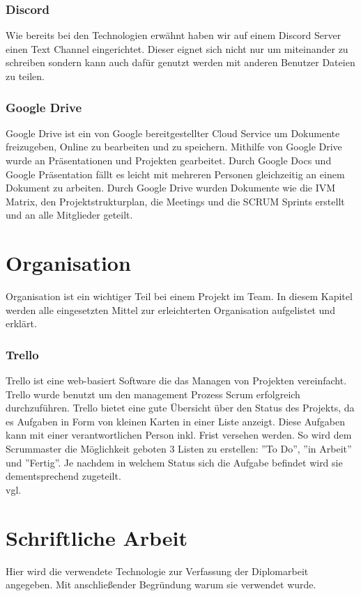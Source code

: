 \subsubsection {Discord}
\label{sec:Discord}
Wie bereits bei den Technologien erwähnt haben wir auf einem Discord Server einen Text Channel eingerichtet. Dieser eignet sich nicht nur um miteinander zu schreiben sondern kann auch dafür genutzt werden mit anderen Benutzer Dateien zu teilen. 
\subsubsection {Google Drive}
\label{sec:GoogleDrive}
Google Drive ist ein von Google bereitgestellter Cloud Service um Dokumente freizugeben, Online zu bearbeiten und zu speichern.
Mithilfe von Google Drive wurde an Präsentationen und Projekten gearbeitet. Durch Google Docs und Google Präsentation fällt es leicht mit mehreren Personen gleichzeitig an einem Dokument zu arbeiten. Durch Google Drive wurden Dokumente wie die IVM Matrix, den Projektstrukturplan, die Meetings und die SCRUM Sprints erstellt und an alle Mitglieder geteilt. 
\section{Organisation}
\label{sec:Organisation}
Organisation ist ein wichtiger Teil bei einem Projekt im Team. In diesem Kapitel werden alle eingesetzten Mittel zur erleichterten Organisation aufgelistet und erklärt.
\subsubsection {Trello}
\label{sec:Trello}
Trello ist eine web-basiert Software die das Managen von Projekten vereinfacht. Trello wurde benutzt um den management Prozess Scrum erfolgreich durchzuführen. Trello bietet eine gute Übersicht über den Status des Projekts, da es Aufgaben in Form von kleinen Karten in einer Liste anzeigt. Diese Aufgaben kann mit einer verantwortlichen Person inkl. Frist versehen werden. So wird dem Scrummaster die Möglichkeit geboten 3 Listen zu erstellen: ''To Do'', ''in Arbeit'' und ''Fertig''. Je nachdem in welchem Status sich die Aufgabe befindet wird sie dementsprechend zugeteilt. \\vgl. \cite{trello} 
\section{Schriftliche Arbeit}
\label{sec:TechSchriftlicheArbeit}
Hier wird die verwendete Technologie zur Verfassung der Diplomarbeit angegeben. Mit anschließender Begründung warum sie verwendet wurde.

